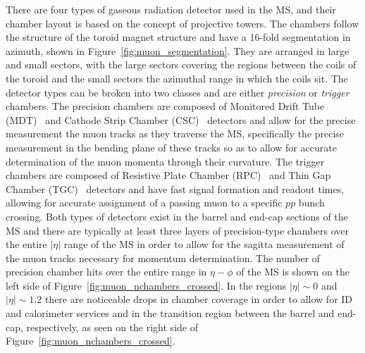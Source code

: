There are four types of gaseous radiation detector used in the MS, and their chamber
layout is based on the concept of projective towers.
The chambers follow the structure of the toroid magnet structure and have a 16-fold segmentation
in azimuth, shown in Figure~\ref{fig:muon_segmentation}.
They are arranged in large and small sectors, with the large sectors covering
the regions between the coils of the toroid and the small sectors the azimuthal range
in which the coils sit.
The detector types can be broken into two classes and are either
\textit{precision} or \textit{trigger} chambers.
The precision chambers are composed of Monitored Drift Tube (MDT)~\cite{Bauer:2016gyg} and Cathode Strip Chamber (CSC)~\cite{Argyropoulos:2009zz}
detectors and allow for
the precise measurement the muon tracks as they traverse the MS, specifically the
precise measurement in the bending plane of these tracks so as to allow for accurate
determination of the muon momenta through their curvature.
The trigger chambers are composed of Resistive Plate Chamber (RPC)~\cite{Aielli:2006hg} and Thin Gap Chamber (TGC)~\cite{Majewski:1984ag}
detectors and have fast signal formation and readout times, allowing for
accurate assignment of a passing muon to a specific $pp$ bunch crossing.
Both types of detectors exist in the barrel and end-cap sections of the
MS and there are typically at least three layers of precision-type chambers over the
entire $\lvert \eta \rvert$ range of the MS in order to allow for the sagitta measurement
of the muon tracks necessary for momentum determination.
The number of precision chamber  hits over the entire range in $\eta-\phi$ of the MS
is shown on the left side of Figure~\ref{fig:muon_nchambers_crossed}. 
In the regions $\lvert \eta \rvert \sim 0$ and $\lvert \eta \rvert \sim 1.2$ there
are noticeable drops in chamber coverage in order to allow for ID and calorimeter
services and in the transition region between the barrel and end-cap, respectively,
as seen on the right side of Figure~\ref{fig:muon_nchambers_crossed}.


